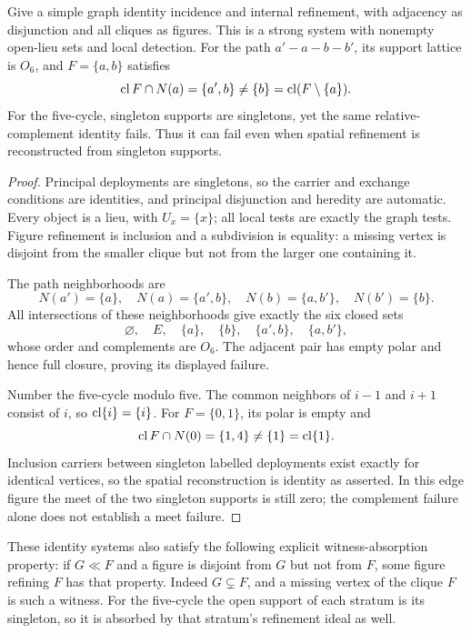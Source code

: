 \begin{proposition}\label{prop:graph-failures}
Give a simple graph identity incidence and internal refinement,
with adjacency as disjunction and all cliques as figures. This
is a strong system with nonempty open-lieu sets and local detection.
For the path $a'\! -\! a\! -\! b\! -\! b'$, its support lattice is
$O_6$, and $F=\{a,b\}$ satisfies
\[
 \operatorname{cl} F\cap N(a)=\{a',b\}\ne\{b\}=\operatorname{cl}(F\setminus\{a\}).
\]
For the five-cycle, singleton supports are singletons, yet the
same relative-complement identity fails. Thus it can fail even
when spatial refinement is reconstructed from singleton supports.
\end{proposition}
\begin{proof}
Principal deployments are singletons, so the carrier and exchange
conditions are identities, and principal disjunction and heredity
are automatic. Every object is a lieu, with $U_x=\{x\}$; all local
tests are exactly the graph tests. Figure refinement is inclusion
and a subdivision is equality: a missing vertex is disjoint from
the smaller clique but not from the larger one containing it.

The path neighborhoods are
\[
 N(a')=\{a\},\quad N(a)=\{a',b\},\quad
 N(b)=\{a,b'\},\quad N(b')=\{b\}.
\]
All intersections of these neighborhoods give exactly the six
closed sets
\[
 \varnothing,\quad E,\quad\{a\},\quad\{b\},\quad\{a',b\},\quad\{a,b'\},
\]
whose order and complements are $O_6$. The adjacent pair has
empty polar and hence full closure, proving its displayed failure.

Number the five-cycle modulo five. The common neighbors of
$i-1$ and $i+1$ consist of $i$, so $\operatorname{cl}\{i\}=\{i\}$.
For $F=\{0,1\}$, its polar is empty and
\[
 \operatorname{cl} F\cap N(0)=\{1,4\}\ne\{1\}=\operatorname{cl}\{1\}.
\]
Inclusion carriers between singleton labelled deployments exist
exactly for identical vertices, so the spatial reconstruction
is identity as asserted. In this edge figure the meet of the
two singleton supports is still zero; the complement failure
alone does not establish a meet failure.
\end{proof}

These identity systems also satisfy the following explicit
witness-absorption property: if $G\ll F$ and a figure is disjoint
from $G$ but not from $F$, some figure refining $F$ has that
property. Indeed $G\subsetneq F$, and a missing vertex of the
clique $F$ is such a witness. For the five-cycle the open support
of each stratum is its singleton, so it is absorbed by that
stratum's refinement ideal as well.

